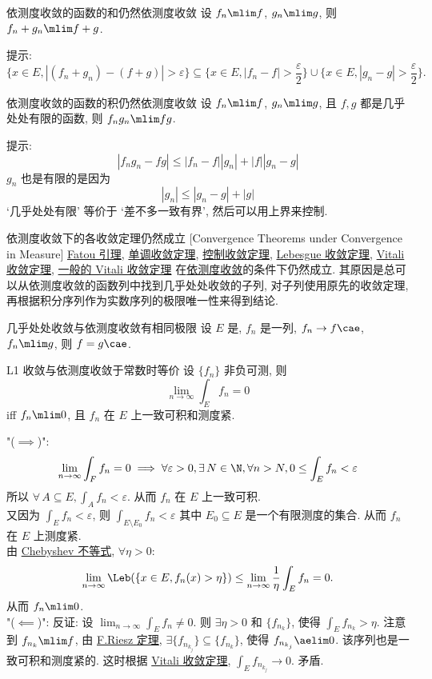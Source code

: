 \begin{thm}
    {依测度收敛的函数的和仍然依测度收敛}
    设 \(f_n\mlim f\), \(g_n\mlim g\), 则 \(f_n+g_n\mlim f+g\).
\end{thm}
\begin{prf}
    提示:
    \[\{x\in E, |(f_n+g_n)-(f+g)|>\varepsilon\}\subseteq\{x\in E, |f_n-f|>\frac{\varepsilon}{2}\}\cup\{x\in E, |g_n-g|>\frac{\varepsilon}{2}\}.\]
\end{prf}
\begin{thm}
    {依测度收敛的函数的积仍然依测度收敛}
    设 \(f_n\mlim f\), \(g_n\mlim g\), 且 \(f,g\) 都是几乎处处有限的函数, 则 \(f_ng_n\mlim fg\).
\end{thm}
\begin{prf}
    提示:
    \[|f_ng_n-fg|\leq |f_n-f||g_n|+|f||g_n-g|\]
    \(g_n\) 也是有限的是因为
    \[|g_n|\leq |g_n-g|+|g|\]
    `几乎处处有限' 等价于 `差不多一致有界', 然后可以用上界来控制.
\end{prf}
\begin{thm}
    {依测度收敛下的各收敛定理仍然成立}
    [Convergence Theorems under Convergence in Measure]
    \hyperref[thm:fatou]{Fatou 引理}, \hyperref[thm:mct]{单调收敛定理}, \hyperref[thm:dct]{控制收敛定理}, \hyperref[thm:lct]{Lebesgue 收敛定理}, \hyperref[thm:vct-1]{Vitali 收敛定理}, \hyperref[thm:vct-2]{一般的 Vitali 收敛定理} 在\hyperref[dfn:convergence-in-measure]{依测度收敛}的条件下仍然成立. 其原因是总可以从依测度收敛的函数列中找到几乎处处收敛的子列, 对子列使用原先的收敛定理, 再根据积分序列作为实数序列的极限唯一性来得到结论.
\end{thm}
\begin{crl}
    {几乎处处收敛与依测度收敛有相同极限}
    设 \(E\) 是\MeasurableSet{}, \(f_n\) 是一列\MeasurableFunc{}, \(f_n\to f\cae\), \(f_n\mlim g\), 则 \(f=g\cae\).
\end{crl}
\begin{thm}
    {L1 收敛与依测度收敛于常数时等价}
    设 \(\{f_n\}\) 非负可测, 则
    \[\lim_{n\to\infty}\int_E f_n=0\]
    iff \(f_n\mlim 0\), 且 \(f_n\) 在 \(E\) 上一致可积和测度紧.
\end{thm}
\begin{prf}
    "($\implies$)": 
    \[\lim_{n\to\infty}\int_F f_n=0\implies\forall\varepsilon>0,\exists\,N\in\N,\forall n>N,0\leq\int_E f_n<\varepsilon \]
    所以 \(\forall\,A\subseteq E, \int_A f_n<\varepsilon\). 从而 \(f_n\) 在 \(E\) 上一致可积. \\
    又因为 \(\int_E f_n<\varepsilon\), 则 \(\int_{E\setminus E_0} f_n<\varepsilon\) 其中 \(E_0\subseteq E\) 是一个有限测度的集合. 从而 \(f_n\) 在 \(E\) 上测度紧.\\
    由 \hyperref[thm:chebyshev-inequality]{Chebyshev 不等式}, \(\forall\eta>0\):
    \[\lim_{n\to\infty}\Leb(\{x\in E, f_n(x)>\eta\})\leq\lim_{n\to\infty}\frac{1}{\eta}\int_E f_n=0.\]
    从而 \(f_n\mlim 0\).\\
    "($\impliedby$)": 反证: 设 $\lim_{n\to\infty}\int_E f_n\neq 0$. 则 \(\exists\eta>0\) 和 \(\{f_{n_k}\}\), 使得 \(\int_E f_{n_k}>\eta\). 注意到 \(f_{n_k}\mlim f\), 由 \hyperref[thm:riesz]{F.Riesz 定理}, \(\exists\{f_{n_{k_j}}\}\subseteq\{f_{n_k}\}\), 使得 \(f_{n_{k_j}}\aelim 0\). 该序列也是一致可积和测度紧的. 
    这时根据 \hyperref[thm:vct-1]{Vitali 收敛定理}, \(\int_E f_{n_{k_j}}\to 0\). 矛盾.
\end{prf}
